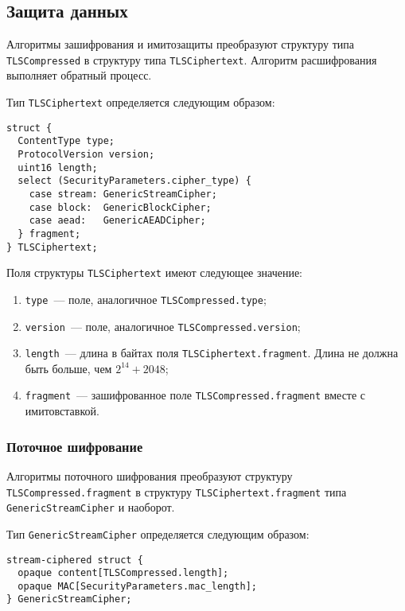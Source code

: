 \subsection{Защита данных}\label{RECORD.3.3}
    
Алгоритмы зашифрования и имитозащиты преобразуют структуру типа 
\lstinline{TLSCompressed} в структуру типа \lstinline{TLSCiphertext}. 
Алгоритм расшифрования выполняет обратный процесс. 

Тип \lstinline{TLSCiphertext} определяется следующим образом:

\begin{lstlisting}
struct {
  ContentType type;
  ProtocolVersion version;
  uint16 length;
  select (SecurityParameters.cipher_type) {
    case stream: GenericStreamCipher;
    case block:  GenericBlockCipher;
    case aead:   GenericAEADCipher;
  } fragment;
} TLSCiphertext;
\end{lstlisting}
 
Поля структуры \lstinline{TLSCiphertext} имеют следующее значение:
\begin{enumerate} 
\item[--]
\lstinline{type}~--- поле, аналогичное \lstinline{TLSCompressed.type};

\item[--]
\lstinline{version}~--- поле, аналогичное \lstinline{TLSCompressed.version};

\item[--]
\lstinline{length}~--- длина в байтах поля 
\lstinline{TLSCiphertext.fragment}. Длина не должна быть больше, чем 
$2^{14} + 2048$; 

\item[--]
\lstinline{fragment}~--- зашифрованное поле 
\lstinline{TLSCompressed.fragment} вместе с имитовставкой. 
\end{enumerate}
                
\subsubsection{Поточное шифрование}\label{RECORD.3.3.1}

Алгоритмы поточного шифрования преобразуют структуру 
\lstinline{TLSCompressed.fragment} в структуру 
\lstinline{TLSCiphertext.fragment} типа \lstinline{GenericStreamCipher} и 
наоборот.   

Тип \lstinline{GenericStreamCipher} определяется следующим образом:
\begin{lstlisting}
stream-ciphered struct {
  opaque content[TLSCompressed.length];
  opaque MAC[SecurityParameters.mac_length];
} GenericStreamCipher;
\end{lstlisting}

